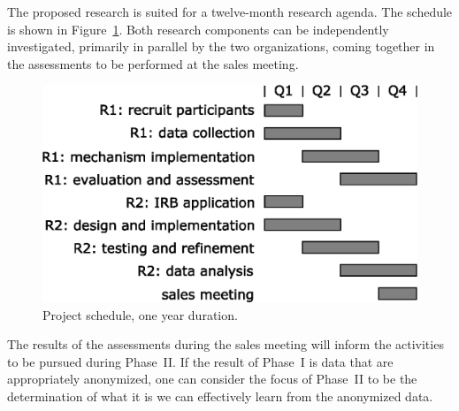 
The proposed research is suited for a twelve-month research agenda.
The schedule is shown in Figure~\ref{fig:gantt}.
Both research components can be independently investigated,
primarily in parallel by the two organizations, coming together
in the assessments to be performed at the sales meeting.

\begin{figure}[h]
 \center
\includegraphics[width=0.6\columnwidth]{gantt}
    \caption{Project schedule, one year duration.}
    \label{fig:gantt}
\end{figure}

The results of the assessments during the sales meeting will inform
the activities to be pursued during Phase~II.
If the result of Phase~I is data that are appropriately anonymized,
one can consider the focus of Phase~II to be the determination of
what it is we can effectively learn from the anonymized data.

